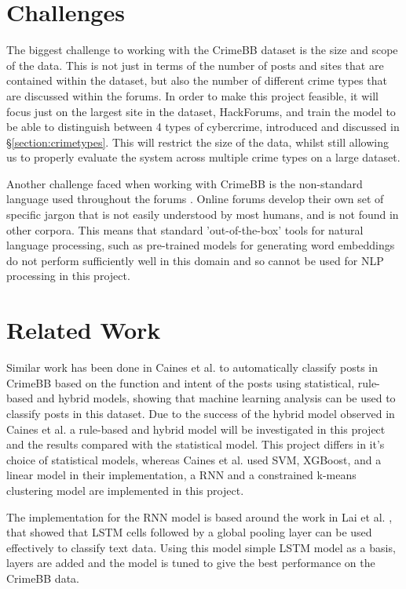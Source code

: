 \documentclass[12pt,a4paper,twoside,openright]{report}
\begin{document}
\section{Challenges}
The biggest challenge to working with the CrimeBB dataset is the size and scope of the data. This is not just in terms of the number of posts and sites that are contained within the dataset, but also the number of different crime types that are discussed within the forums. In order to make this project feasible, it will focus just on the largest site in the dataset, HackForums, and train the model to be able to distinguish between 4 types of cybercrime, introduced and discussed in \S\ref{section:crimetypes}. This will restrict the size of the data, whilst still allowing us to properly evaluate the system across multiple crime types on a large dataset.
\newline

Another challenge faced when working with CrimeBB is the non-standard language used throughout the forums \cite{intent} \cite{portnoff2017tools}. Online forums develop their own set of specific jargon that is not easily understood by most humans, and is not found in other corpora. This means that standard 'out-of-the-box' tools for natural language processing, such as pre-trained models for generating word embeddings do not perform sufficiently well in this domain and so cannot be used for NLP processing in this project.

\section{Related Work}
Similar work has been done in Caines et al. \cite{intent} to automatically classify posts in CrimeBB based on the function and intent of the posts using statistical, rule-based and hybrid models, showing that machine learning analysis can be used to classify posts in this dataset. Due to the success of the hybrid model observed in Caines et al. a rule-based and hybrid model will be investigated in this project and the results compared with the statistical model. This project differs in it's choice of statistical models, whereas Caines et al. used SVM, XGBoost, and a linear model in their implementation, a RNN and a constrained k-means clustering model are implemented in this project. 

The implementation for the RNN model is based around the work in Lai et al. \cite{lai2015recurrent}, that showed that LSTM cells followed by a global pooling layer can be used effectively to classify text data. Using this model simple LSTM model as a basis, layers are added and the model is tuned to give the best performance on the CrimeBB data. 
\end{document}
